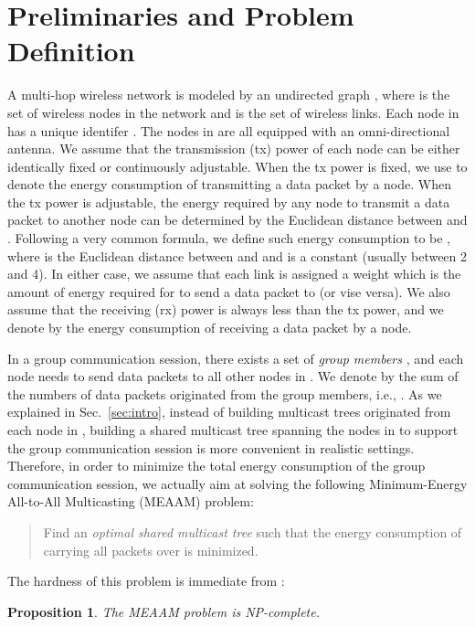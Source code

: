 \documentclass[10pt, conference, compsocconf]{IEEEtran}
\newtheorem{prop}{\textbf{Proposition}}
\begin{document}
\section{Preliminaries and Problem Definition} \label{sec:model}
A  multi-hop wireless network is modeled by an undirected graph , where  is the set of wireless nodes in the network and  is the set of wireless links. Each node in  has a unique identifer . The nodes in  are
all equipped with an omni-directional antenna. We assume that the transmission (tx) power of each node can be either identically fixed or continuously adjustable. When the tx power is fixed, we use  to denote the energy consumption of transmitting a data packet by a node. When the tx power is adjustable, the energy required by any node  to transmit a data packet to another node  can be determined by the Euclidean distance between  and . Following a very common formula, we define such energy consumption to be , where  is the Euclidean distance between  and  and  is a constant (usually between 2 and 4). In either case, we assume that each link  is assigned a weight which is the amount of energy required for  to send a data packet to  (or vise versa). We also assume that the receiving (rx) power is always less than the tx power, and we denote by  the energy consumption of receiving a data packet by a node.

  In a group communication session, there exists a set of \textit{group members} , and each node  needs to send  data packets to all other nodes in . We denote by  the sum of the numbers of data packets originated from the group members, i.e., . As we explained in Sec.~\ref{sec:intro}, instead of building  multicast trees originated from each node in , building a shared multicast tree spanning the nodes in  to support the group communication session is more convenient in realistic settings. Therefore, in order to minimize the total energy consumption of the group communication session, we actually aim at solving the following Minimum-Energy All-to-All Multicasting (MEAAM) problem:
\begin{quote}
    Find an \textit{optimal shared multicast tree}  such that the energy consumption of carrying all  packets over  is minimized.
  \end{quote}

  The hardness of this problem is immediate from \cite{Liang2009}:
\begin{prop} \label{prp:NPC}
    The MEAAM problem is NP-complete.
  \end{prop}
\end{document}
